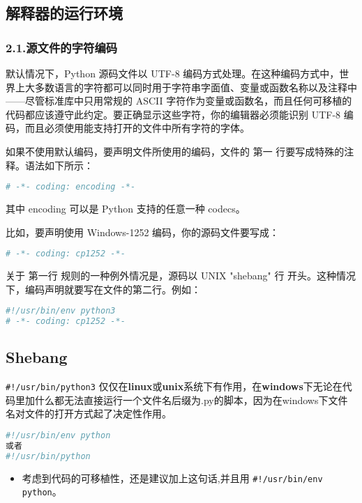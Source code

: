 \subsection{解释器的运行环境}

\subsubsection{2.1.源文件的字符编码}

默认情况下，Python 源码文件以 UTF-8 编码方式处理。在这种编码方式中，世界上大多数语言的字符都可以同时用于字符串字面值、变量或函数名称以及注释中——尽管标准库中只用常规的 ASCII 字符作为变量或函数名，而且任何可移植的代码都应该遵守此约定。要正确显示这些字符，你的编辑器必须能识别 UTF-8 编码，而且必须使用能支持打开的文件中所有字符的字体。

如果不使用默认编码，要声明文件所使用的编码，文件的 第一 行要写成特殊的注释。语法如下所示：

\begin{lstlisting}[language=python]
# -*- coding: encoding -*-
\end{lstlisting}
其中 encoding 可以是 Python 支持的任意一种 codecs。

比如，要声明使用 Windows-1252 编码，你的源码文件要写成：

\begin{lstlisting}[language=python]
# -*- coding: cp1252 -*-
\end{lstlisting}
关于 第一行 规则的一种例外情况是，源码以 UNIX "shebang" 行 开头。这种情况下，编码声明就要写在文件的第二行。例如：

\begin{lstlisting}[language=python]
#!/usr/bin/env python3
# -*- coding: cp1252 -*-
\end{lstlisting}

\subsection{Shebang}
\verb`#!/usr/bin/python3` 仅仅在\textbf{linux}或\textbf{unix}系统下有作用，在\textbf{windows}下无论在代码里加什么都无法直接运行一个文件名后缀为.py的脚本，因为在windows下文件名对文件的打开方式起了决定性作用。
\begin{lstlisting}[language=python]
#!/usr/bin/env python
或者
#!/usr/bin/python
\end{lstlisting}
\begin{itemize}
\item 考虑到代码的可移植性，还是建议加上这句话,并且用 \verb`#!/usr/bin/env python`。
\end{itemize}

